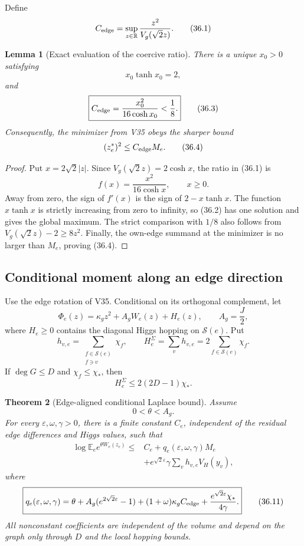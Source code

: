 \documentclass[11pt]{article}
\newtheorem{theorem}{Theorem}[section]
\newtheorem{lemma}[theorem]{Lemma}
\theoremstyle{remark}
\begin{document}
Define
\[
 C_{\rm edge}
 =\sup_{z\in\mathbb R}
 \frac{z^2}{V_g(\sqrt2z)}.                         \tag{36.1}
\]

\begin{lemma}[Exact evaluation of the coercive ratio]
\label{lem:v17v36-constant}
There is a unique \(x_0>0\) satisfying
\[
 x_0\tanh x_0=2,                                   \tag{36.2}
\]
and
\[
 \boxed{
 C_{\rm edge}=\frac{x_0^2}{16\cosh x_0}<\frac18.} \tag{36.3}
\]
Consequently, the minimizer from V35 obeys the sharper bound
\[
 (z_e^*)^2\leq C_{\rm edge}M_e.                   \tag{36.4}
\]
\end{lemma}

\begin{proof}
Put \(x=2\sqrt2|z|\).  Since
\(V_g(\sqrt2z)=2\cosh x\), the ratio in (36.1) is
\[
 f(x)=\frac{x^2}{16\cosh x},\qquad x\geq0.         \tag{36.5}
\]
Away from zero, the sign of \(f'(x)\) is the sign of
\(2-x\tanh x\).  The function \(x\tanh x\) is strictly increasing
from zero to infinity, so (36.2) has one solution and gives the global
maximum.  The strict comparison with \(1/8\) also follows from
\(V_g(\sqrt2z)-2\geq8z^2\).  Finally, the own-edge summand at the
minimizer is no larger than \(M_e\), proving (36.4).
\end{proof}

\subsection{Conditional moment along an edge direction}

Use the edge rotation of V35.  Conditional on its orthogonal
complement, let
\[
 \Phi_e(z)=\kappa_gz^2+A_gW_e(z)+H_e(z),
 \qquad A_g=\frac J2,                              \tag{36.6}
\]
where \(H_e\geq0\) contains the diagonal Higgs hopping on
\(\mathcal S(e)\).  Put
\[
 h_{v,e}=\sum_{\substack{f\in\mathcal S(e)\\f\ni v}}\chi_f,
 \qquad
 H_e^{\Sigma}=\sum_vh_{v,e}=2\sum_{f\in\mathcal S(e)}\chi_f.    \tag{36.7}
\]
If \(\deg G\leq D\) and \(\chi_f\leq\chi_*\), then
\[
 H_e^{\Sigma}\leq2(2D-1)\chi_*.                  \tag{36.8}
\]

\begin{theorem}[Edge-aligned conditional Laplace bound]
\label{thm:v17v36-conditional}
Assume
\[
 0<\theta<A_g.                                     \tag{36.9}
\]
For every \(\varepsilon,\omega,\gamma>0\), there is a finite constant
\(C_e\), independent of the residual edge differences and Higgs values,
such that
\[
\begin{aligned}
 \log\mathbb E_e e^{\theta W_e(z_e)}
 \leq{}&C_e+q_e(\varepsilon,\omega,\gamma)M_e\\
 &+e^{\sqrt2\varepsilon}\gamma
 \sum_vh_{v,e}V_H(y_v),                            \tag{36.10}
\end{aligned}
\]
where
\[
\boxed{
 q_e(\varepsilon,\omega,\gamma)
 =\theta+A_g(e^{2\sqrt2\varepsilon}-1)
 +(1+\omega)\kappa_gC_{\rm edge}
 +\frac{e^{\sqrt2\varepsilon}\chi_*}{4\gamma}.}  \tag{36.11}
\]
All nonconstant coefficients are independent of the volume and depend
on the graph only through \(D\) and the local hopping bounds.
\end{theorem}
\end{document}
